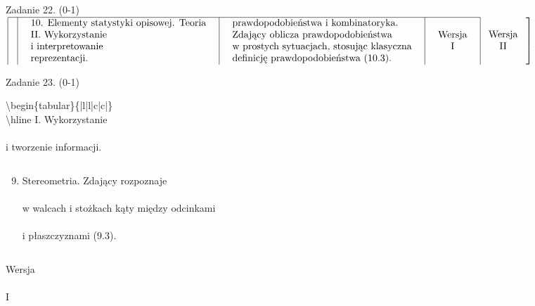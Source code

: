 \documentclass[10pt]{article}
\begin{document}
Zadanie 22. (0-1)\\
$\left.\begin{array}{|l|l|c|c|}\hline & \begin{array}{l}\text { 10. Elementy statystyki opisowej. Teoria } \\ \text { II. Wykorzystanie } \\ \text { i interpretowanie } \\ \text { reprezentacji. }\end{array} & \begin{array}{l}\text { prawdopodobieństwa i kombinatoryka. } \\ \text { Zdający oblicza prawdopodobieństwa } \\ \text { w prostych sytuacjach, stosując klasyczna } \\ \text { definicję prawdopodobieństwa (10.3). }\end{array} & \begin{array}{c}\text { Wersja } \\ \text { I }\end{array}\end{array} \begin{array}{c}\text { Wersja } \\ \text { II }\end{array}\right]$

Zadanie 23. (0-1)

$\left.$\textbackslash begin\{tabular\}\{|l|l|c|c|\}\\
\textbackslash hline I. Wykorzystanie \\
\\
i tworzenie informacji.

 \begin{tabular}{l}
\end{tabular}

\begin{enumerate}
  \setcounter{enumi}{8}
  \item Stereometria. Zdający rozpoznaje \\
\\
w walcach i stożkach kąty między odcinkami \\
\\
i płaszczyznami (9.3).
\end{enumerate}

 \begin{tabular}{c}
\end{tabular}

Wersja \\
\\
I
\end{document}

